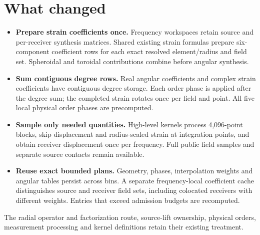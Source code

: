 \documentclass[11pt,a4paper]{article}
\begin{document}
\section{What changed}
\begin{itemize}
\item \textbf{Prepare strain coefficients once.} Frequency workspaces retain source and per-receiver synthesis matrices. Shared existing strain formulas prepare six-component coefficient rows for each exact resolved element/radius and field set. Spheroidal and toroidal contributions combine before angular synthesis.
\item \textbf{Sum contiguous degree rows.} Real angular coefficients and complex strain coefficients have contiguous degree storage. Each order phase is applied after the degree sum; the completed strain rotates once per field and point. All five local physical order phases are precomputed.
\item \textbf{Sample only needed quantities.} High-level kernels process 4,096-point blocks, skip displacement and radius-scaled strain at integration points, and obtain receiver displacement once per frequency. Full public field samples and separate source contacts remain available.
\item \textbf{Reuse exact bounded plans.} Geometry, phases, interpolation weights and angular tables persist across bins. A separate frequency-local coefficient cache distinguishes source and receiver field sets, including colocated receivers with different weights. Entries that exceed admission budgets are recomputed.
\end{itemize}
The radial operator and factorization route, source-lift ownership, physical orders, measurement processing and kernel definitions retain their existing treatment.
\newpage
\end{document}
